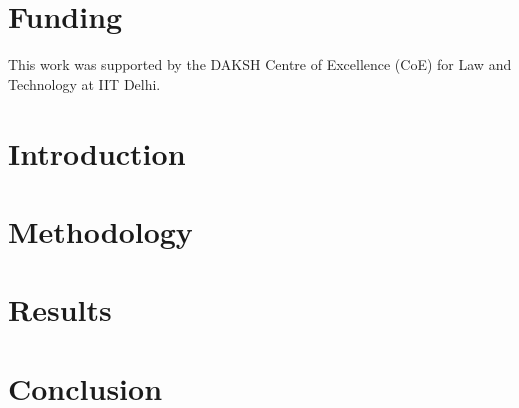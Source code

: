 \documentclass[12pt,a4paper]{article}
\begin{document}
\section*{Funding}
This work was supported by the DAKSH Centre of Excellence (CoE) for Law and Technology at IIT Delhi.

\newpage
\tableofcontents

\newpage
\printglossaries

\newpage
\listoftables

\newpage
\section{Introduction}
\label{sec:introduction}


\section{Methodology}
\label{sec:methodology}


\section{Results}
\label{sec:results}


\section{Conclusion}
\label{sec:conclusion}


\newpage
\printbibliography[heading=bibintoc]

\newpage
\begin{appendices}

\end{appendices}
\end{document}
